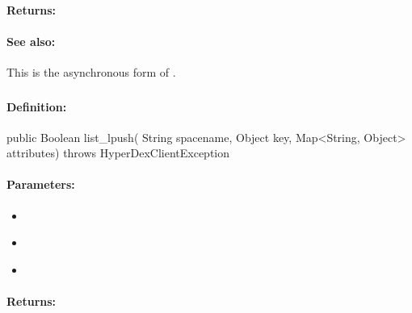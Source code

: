 \paragraph{Returns:}


\paragraph{See also:}  This is the asynchronous form of .

\pagebreak
\subsubsection{}
\label{api:java:list_lpush}


\paragraph{Definition:}
\begin{javacode}
public Boolean list_lpush(
        String spacename,
        Object key,
        Map<String, Object> attributes) throws HyperDexClientException
\end{javacode}

\paragraph{Parameters:}
\begin{itemize}[noitemsep]
\item {}\\

\item {}\\

\item {}\\

\end{itemize}

\paragraph{Returns:}


